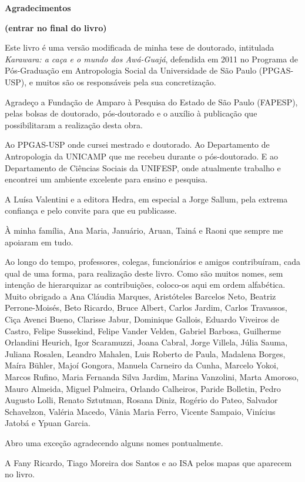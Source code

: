 \textbf{Agradecimentos}

\textbf{(entrar no final do livro)}

Este livro é uma versão modificada de minha tese de doutorado,
intitulada \emph{Karawara: a caça e o mundo dos Awá-Guajá}, defendida em
2011 no Programa de Pós-Graduação em Antropologia Social da Universidade
de São Paulo (PPGAS-USP), e muitos são os responsáveis pela sua
concretização.

Agradeço a Fundação de Amparo à Pesquisa do Estado de São Paulo
(FAPESP), pelas bolsas de doutorado, pós-doutorado e o auxílio à
publicação que possibilitaram a realização desta obra.

Ao PPGAS-USP onde cursei mestrado e doutorado. Ao Departamento de
Antropologia da UNICAMP que me recebeu durante o pós-doutorado. E ao
Departamento de Ciências Sociais da UNIFESP, onde atualmente trabalho e
encontrei um ambiente excelente para ensino e pesquisa.

A Luísa Valentini e a editora Hedra, em especial a Jorge Sallum, pela
extrema confiança e pelo convite para que eu publicasse.

À minha família, Ana Maria, Januário, Aruan, Tainá e Raoni que sempre me
apoiaram em tudo.

Ao longo do tempo, professores, colegas, funcionários e amigos
contribuíram, cada qual de uma forma, para realização deste livro. Como
são muitos nomes, sem intenção de hierarquizar as contribuições,
coloco-os aqui em ordem alfabética. Muito obrigado a Ana Cláudia
Marques, Aristóteles Barcelos Neto, Beatriz Perrone-Moisés, Beto
Ricardo, Bruce Albert, Carlos Jardim, Carlos Travassos, Ciça Avenci
Bueno, Clarisse Jabur, Dominique Gallois, Eduardo Viveiros de Castro,
Felipe Sussekind, Felipe Vander Velden, Gabriel Barbosa, Guilherme
Orlandini Heurich, Igor Scaramuzzi, Joana Cabral, Jorge Villela, Júlia
Sauma, Juliana Rosalen, Leandro Mahalen, Luis Roberto de Paula, Madalena
Borges, Maíra Bühler, Majoí Gongora, Manuela Carneiro da Cunha, Marcelo
Yokoi, Marcos Rufino, Maria Fernanda Silva Jardim, Marina Vanzolini,
Marta Amoroso, Mauro Almeida, Miguel Palmeira, Orlando Calheiros, Paride
Bolletin, Pedro Augusto Lolli, Renato Sztutman, Rosana Diniz, Rogério do
Pateo, Salvador Schavelzon, Valéria Macedo, Vânia Maria Ferro, Vicente
Sampaio, Vinícius Jatobá e Ypuan Garcia.

Abro uma exceção agradecendo alguns nomes pontualmente.

A Fany Ricardo, Tiago Moreira dos Santos e ao ISA pelos mapas que
aparecem no livro.

